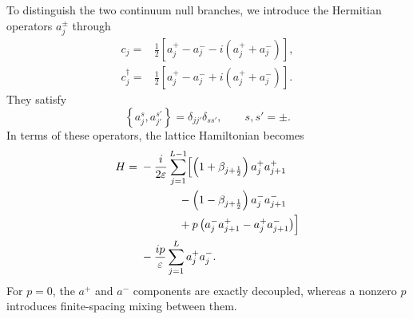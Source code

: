 \documentclass[reprint,amsmath,amssymb,aps,showkeys,superscriptaddress]{revtex4-2}
\begin{document}
To distinguish the two continuum null branches, we introduce the
Hermitian operators $a_j^\pm$ through
\begin{subequations}
\label{eq:a_definition}
\begin{align}
  c_j
  ={}&
  \frac{1}{2}
  \left[
    a_j^+-a_j^-
    -i\left(a_j^++a_j^-\right)
  \right],
  \\
  c_j^\dagger
  ={}&
  \frac{1}{2}
  \left[
    a_j^+-a_j^-
    +i\left(a_j^++a_j^-\right)
  \right].
\end{align}
\end{subequations}
They satisfy
\begin{equation}
  \left\{
    a_j^s,a_{j'}^{s'}
  \right\}
  =
  \delta_{jj'}\delta_{ss'},
  \qquad
  s,s'=\pm.
  \label{eq:a_anticommutation}
\end{equation}
In terms of these operators, the lattice Hamiltonian becomes
\begin{align}
  H
  ={}&
  -\frac{i}{2\varepsilon}
  \sum_{j=1}^{L-1}
  \Bigl[
    \left(
      1+\beta_{j+\frac12}
    \right)
    a_j^+a_{j+1}^+
  \nonumber\\
  &\hspace{12mm}
    -
    \left(
      1-\beta_{j+\frac12}
    \right)
    a_j^-a_{j+1}^-
  \nonumber\\
  &\hspace{12mm}
    +
    p\left(
      a_j^-a_{j+1}^+
      -
      a_j^+a_{j+1}^-
    \right)
  \Bigr]
  \nonumber\\
  &-
  \frac{i p}{\varepsilon}
  \sum_{j=1}^{L}
  a_j^+a_j^- .
  \label{eq:H_in_a}
\end{align}
For $p=0$, the $a^+$ and $a^-$ components are exactly decoupled,
whereas a nonzero $p$ introduces finite-spacing mixing between them.
\end{document}
